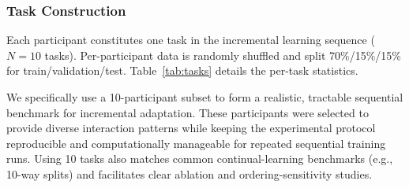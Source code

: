 \documentclass[3p,times,procedia]{elsarticle}
\begin{document}
\subsubsection{Task Construction}

Each participant constitutes one task in the incremental learning sequence ($N = 10$ tasks). Per-participant data is randomly shuffled and split 70\%/15\%/15\% for train/validation/test. Table~\ref{tab:tasks} details the per-task statistics.

We specifically use a 10-participant subset to form a realistic, tractable sequential benchmark for incremental adaptation. These participants were selected to provide diverse interaction patterns while keeping the experimental protocol reproducible and computationally manageable for repeated sequential training runs. Using 10 tasks also matches common continual-learning benchmarks (e.g., 10-way splits) and facilitates clear ablation and ordering-sensitivity studies\cite{nguyenlam2026unlockingcompositionalgeneralizationcontinual}.

\end{document}
